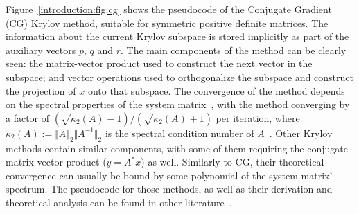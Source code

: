 Figure~\ref{introduction:fig:cg} shows the pseudocode of the Conjugate Gradient
(CG) Krylov method, suitable for symmetric positive definite matrices. The
information about the current Krylov subspace is stored implicitly as part of
the auxiliary vectors $p$, $q$ and $r$. The main components of the method can
be clearly seen: the matrix-vector product used to construct the next vector in
the subspace; and vector operations used to orthogonalize the subspace and
construct the projection of $x$ onto that subspace. The convergence of the
method depends on the spectral properties
of the system matrix~\cite{barrettemplates,demmel,saad}, with the method
converging by a factor of $(\sqrt{\kappa_2(A)} - 1)/(\sqrt{\kappa_2(A)} + 1)$
per iteration, where $\kappa_2(A) := \Vert A \Vert_2 \Vert A^{-1} \Vert_2$ is
the spectral condition number   of
$A$~\cite{barrettemplates,demmel,saad}. Other Krylov methods contain similar
components, with some of them requiring the conjugate matrix-vector product ($y
= A^*x$) as well. Similarly to CG, their theoretical convergence can usually be
bound by some polynomial of the system matrix' spectrum. The pseudocode for
those methods, as well as their derivation and theoretical analysis can be found
in other literature~\cite{barrettemplates,demmel,saad}.

